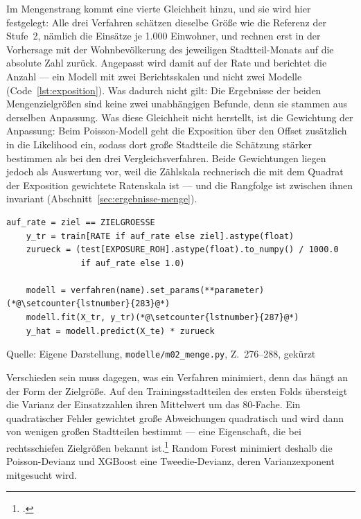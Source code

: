 \documentclass[12pt,a4paper]{article}
\newcommand{\tabquelle}[1][Eigene Darstellung]{%
  \par\setlength{\parskip}{0pt}\vspace{3pt}%
  {\setstretch{1}\fontsize{9pt}{11pt}\selectfont\raggedright Quelle: #1\par}%
}
\begin{document}
Im Mengenstrang kommt eine vierte Gleichheit hinzu, und sie wird hier
festgelegt: Alle drei Verfahren schätzen dieselbe Größe wie die Referenz der
Stufe~2, nämlich die Einsätze je 1.000 Einwohner, und rechnen erst in der
Vorhersage mit der Wohnbevölkerung des jeweiligen Stadtteil-Monats auf die
absolute Zahl zurück. Angepasst wird damit auf der Rate und berichtet die
Anzahl --- ein Modell mit zwei Berichtsskalen und nicht zwei Modelle (Code~\ref{lst:exposition}). Was dadurch nicht gilt: Die Ergebnisse der beiden Mengenzielgrößen sind keine zwei unabhängigen Befunde, denn sie stammen aus derselben Anpassung. Was diese Gleichheit nicht herstellt, ist die Gewichtung der Anpassung: Beim Poisson-Modell geht die Exposition über den Offset zusätzlich in die Likelihood ein, sodass dort große Stadtteile die Schätzung stärker bestimmen als bei den drei Vergleichsverfahren. Beide Gewichtungen liegen jedoch als Auswertung vor, weil die Zählskala rechnerisch die mit dem Quadrat der Exposition gewichtete Ratenskala ist --- und die Rangfolge ist zwischen ihnen invariant (Abschnitt~\ref{sec:ergebnisse-menge}).

\begin{quellcode}[htbp]
\caption{Geschätzt wird die Rate, berichtet wird die Anzahl}
\label{lst:exposition}\vspace{-3.5pt}
\begin{lstlisting}[style=pythonstil,firstnumber=276]
    auf_rate = ziel == ZIELGROESSE
    y_tr = train[RATE if auf_rate else ziel].astype(float)
    zurueck = (test[EXPOSURE_ROH].astype(float).to_numpy() / 1000.0
               if auf_rate else 1.0)

    modell = verfahren(name).set_params(**parameter)(*@\setcounter{lstnumber}{283}@*)
    modell.fit(X_tr, y_tr)(*@\setcounter{lstnumber}{287}@*)
    y_hat = modell.predict(X_te) * zurueck
\end{lstlisting}
\tabquelle[Eigene Darstellung, \texttt{modelle/m02\_menge.py}, Z.~276--288, gekürzt]
\end{quellcode}


Verschieden sein muss dagegen, was ein Verfahren minimiert, denn das hängt an
der Form der Zielgröße. Auf den Trainingsstadtteilen des ersten Folds
übersteigt die Varianz der Einsatzzahlen ihren Mittelwert um das 80-Fache. Ein
quadratischer Fehler gewichtet große Abweichungen quadratisch und wird dann von
wenigen großen Stadtteilen bestimmt --- eine Eigenschaft, die bei
rechtsschiefen Zielgrößen bekannt ist.\footcite[349]{Hastie2009} Random Forest
minimiert deshalb die Poisson-Devianz und XGBoost eine Tweedie-Devianz, deren
Varianzexponent mitgesucht wird.
\end{document}
